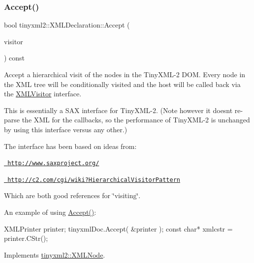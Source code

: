 \subsubsection{\texorpdfstring{Accept()}{Accept()}}
{\footnotesize\ttfamily bool tinyxml2\+::\+X\+M\+L\+Declaration\+::\+Accept (\begin{DoxyParamCaption}\item[{\mbox{\hyperlink{classtinyxml2_1_1_x_m_l_visitor}{X\+M\+L\+Visitor}} $\ast$}]{visitor }\end{DoxyParamCaption}) const\hspace{0.3cm}{\ttfamily [virtual]}}

Accept a hierarchical visit of the nodes in the Tiny\+X\+M\+L-\/2 D\+OM. Every node in the X\+ML tree will be conditionally visited and the host will be called back via the \mbox{\hyperlink{classtinyxml2_1_1_x_m_l_visitor}{X\+M\+L\+Visitor}} interface.

This is essentially a S\+AX interface for Tiny\+X\+M\+L-\/2. (Note however it doesn\textquotesingle{}t re-\/parse the X\+ML for the callbacks, so the performance of Tiny\+X\+M\+L-\/2 is unchanged by using this interface versus any other.)

The interface has been based on ideas from\+:


\begin{DoxyItemize}
\item \href{http://www.saxproject.org/}{\texttt{ http\+://www.\+saxproject.\+org/}}
\item \href{http://c2.com/cgi/wiki?HierarchicalVisitorPattern}{\texttt{ http\+://c2.\+com/cgi/wiki?\+Hierarchical\+Visitor\+Pattern}}
\end{DoxyItemize}

Which are both good references for \char`\"{}visiting\char`\"{}.

An example of using \mbox{\hyperlink{classtinyxml2_1_1_x_m_l_declaration_acf47629d9fc08ed6f1c164a97bcf794b}{Accept()}}\+: \begin{DoxyVerb}XMLPrinter printer;
tinyxmlDoc.Accept( &printer );
const char* xmlcstr = printer.CStr();
\end{DoxyVerb}
 

Implements \mbox{\hyperlink{classtinyxml2_1_1_x_m_l_node_a81e66df0a44c67a7af17f3b77a152785}{tinyxml2\+::\+X\+M\+L\+Node}}.

\mbox{\label{classtinyxml2_1_1_x_m_l_declaration_ad9d60e6d2df75c13eb6bf7319985b747}} 
